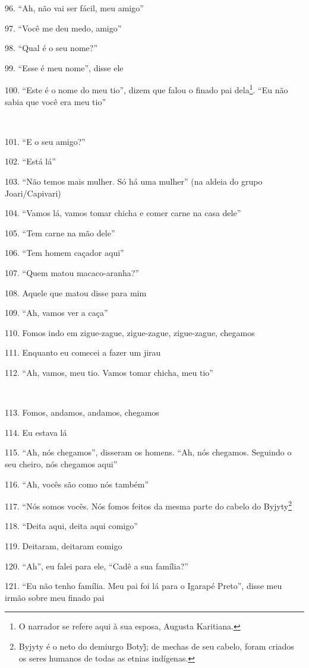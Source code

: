 96. ``Ah, não vai ser fácil, meu amigo''

97. ``Você me deu medo, amigo''

98. ``Qual é o seu nome?''

99. ``Esse é meu nome'', disse ele

100. ``Este é o nome do meu tio'', dizem que falou o finado pai
dela\footnote{O narrador se refere aqui à sua esposa, Augusta Karitiana.}.
``Eu não sabia que você era meu tio''

~

101. ``E o seu amigo?''

102. ``Está lá''

103. ``Não temos mais mulher. Só há uma mulher'' (na aldeia do grupo
Joari/Capivari)

104. ``Vamos lá, vamos tomar chicha e comer carne na casa dele''

105. ``Tem carne na mão dele''

106. ``Tem homem caçador aqui''

107. ``Quem matou macaco-aranha?''

108. Aquele que matou disse para mim

109. ``Ah, vamos ver a caça''

110. Fomos indo em zigue-zague, zigue-zague, zigue-zague, chegamos

111. Enquanto eu comecei a fazer um jirau

112. ``Ah, vamos, meu tio. Vamos tomar chicha, meu tio''

~

113. Fomos, andamos, andamos, chegamos

114. Eu estava lá

115. ``Ah, nós chegamos'', disseram os homens. ``Ah, nós chegamos.
Seguindo o seu cheiro, nós chegamos aqui''

116. ``Ah, vocês são como nós também''

117. ``Nós somos vocês. Nós fomos feitos da mesma parte do cabelo do
Byjyty\footnote{Byjyty é o neto do demiurgo Botyj̃; de mechas de seu
  cabelo, foram criados os seres humanos de todas as etnias indígenas.}

118. ``Deita aqui, deita aqui comigo''

119. Deitaram, deitaram comigo

120. ``Ah'', eu falei para ele, ``Cadê a sua família?''

121. ``Eu não tenho família. Meu pai foi lá para o Igarapé Preto'', disse
meu irmão sobre meu finado pai

